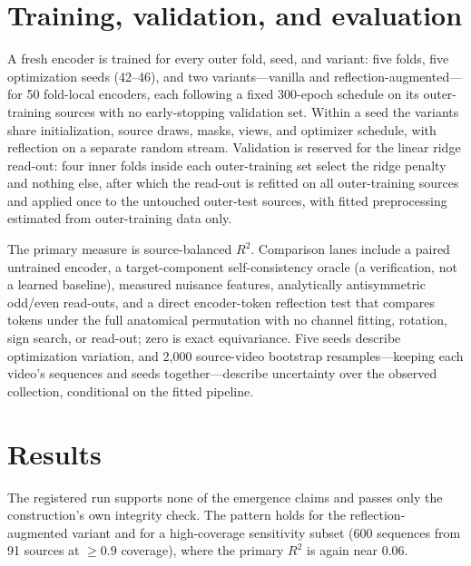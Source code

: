 \documentclass{article}
\begin{document}
\section{Training, validation, and evaluation}

A fresh encoder is trained for every outer fold, seed, and variant: five folds, five optimization seeds (42--46), and two variants---vanilla and reflection-augmented---for 50 fold-local encoders, each following a fixed 300-epoch schedule on its outer-training sources with no early-stopping validation set. Within a seed the variants share initialization, source draws, masks, views, and optimizer schedule, with reflection on a separate random stream. Validation is reserved for the linear ridge read-out: four inner folds inside each outer-training set select the ridge penalty and nothing else, after which the read-out is refitted on all outer-training sources and applied once to the untouched outer-test sources, with fitted preprocessing estimated from outer-training data only.

The primary measure is source-balanced $R^2$. Comparison lanes include a paired untrained encoder, a target-component self-consistency oracle (a verification, not a learned baseline), measured nuisance features, analytically antisymmetric odd/even read-outs, and a direct encoder-token reflection test that compares tokens under the full anatomical permutation with no channel fitting, rotation, sign search, or read-out; zero is exact equivariance. Five seeds describe optimization variation, and 2,000 source-video bootstrap resamples---keeping each video's sequences and seeds together---describe uncertainty over the observed collection, conditional on the fitted pipeline.

\section{Results}

The registered run supports none of the emergence claims and passes only the construction's own integrity check. The pattern holds for the reflection-augmented variant and for a high-coverage sensitivity subset (600 sequences from 91 sources at $\geq0.9$ coverage), where the primary $R^2$ is again near $0.06$.
\end{document}

